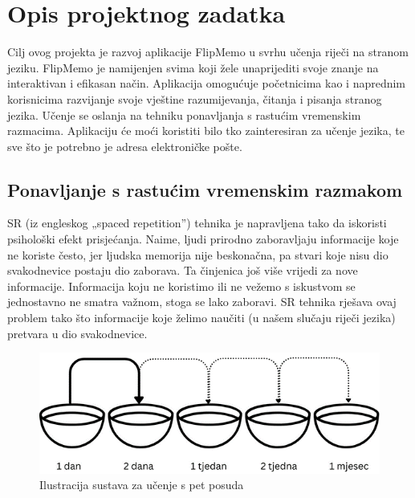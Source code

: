 \chapter{Opis projektnog zadatka}
	
Cilj ovog projekta je razvoj aplikacije FlipMemo u svrhu učenja riječi na stranom jeziku. FlipMemo je namijenjen svima koji žele unaprijediti svoje znanje na interaktivan i efikasan način. Aplikacija omogućuje početnicima kao i naprednim korisnicima razvijanje svoje vještine razumijevanja, čitanja i pisanja stranog jezika. Učenje se oslanja na tehniku ponavljanja s rastućim vremenskim razmacima. Aplikaciju će moći koristiti bilo tko zainteresiran za učenje jezika, te sve što je potrebno je adresa elektroničke pošte.

\section{Ponavljanje s rastućim vremenskim razmakom}

SR (iz engleskog „spaced repetition”) tehnika je napravljena tako da iskoristi psihološki efekt prisjećanja. Naime, ljudi prirodno zaboravljaju informacije koje ne koriste često, jer ljudska memorija nije beskonačna, pa stvari koje nisu dio svakodnevice postaju dio zaborava. Ta činjenica još više vrijedi za nove informacije. Informacija koju ne koristimo ili ne vežemo s iskustvom se jednostavno ne smatra važnom, stoga se lako zaboravi. SR tehnika rješava ovaj problem tako što informacije koje želimo naučiti (u našem slučaju riječi jezika) pretvara u dio svakodnevice.

\begin{figure}[H]
	\includegraphics[scale=0.8]{slike/spaced_repetition.png} 
	\centering
	\caption{Ilustracija sustava za učenje s pet posuda}
	\label{fig:spacedrepetition}
\end{figure}

